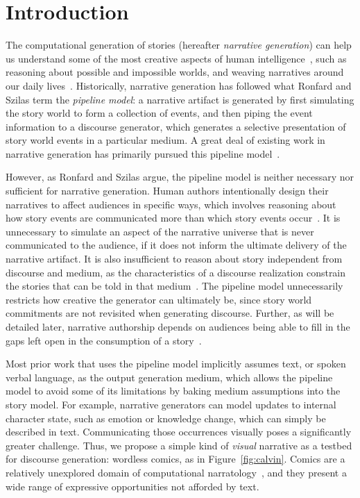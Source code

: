 \section{Introduction}

The computational generation of stories (hereafter {\em narrative
generation}) can help us understand some of the most creative aspects of
human intelligence~\cite{boyd2009origin}, such as reasoning about possible
and impossible worlds, and weaving narratives around our daily
lives~\cite{herman2013storytelling}.  Historically, narrative generation
has followed what Ronfard and Szilas \cite{ronfard2014story} term the
\emph{pipeline model}: a narrative artifact is generated by
first simulating the story world to form a collection of events, and then piping
the event information to a discourse generator, which generates a
selective presentation of story world events in a particular medium. A great
deal of existing work in narrative generation has primarily pursued this
pipeline model~\cite{gervas2009computational}. 

However, as Ronfard and Szilas argue, the pipeline model is neither
necessary nor sufficient for narrative generation.  Human authors
intentionally design their narratives to affect audiences in specific ways,
which involves reasoning about how story events are communicated more than
which story events occur~\cite{chatman1980story,bordwell1989making}. It is
unnecessary to simulate an aspect of the narrative universe that is never
communicated to the audience, if it does not inform the ultimate delivery
of the narrative artifact. It is also insufficient to reason about story
independent from discourse and medium, as the characteristics of a
discourse realization constrain the stories that can be told in that
medium~\cite{herman2004toward}.  The pipeline model unnecessarily restricts
how creative the generator can ultimately be, since story world commitments
are not revisited when generating discourse. Further, as will be detailed
later, narrative authorship depends on audiences being able to fill in the
gaps left open in the consumption of a
story~\cite{saraceni2016relatedness,magliano2016filling}.

Most prior work that uses the pipeline model implicitly assumes text, or
spoken verbal language, as the output generation medium, which allows the
pipeline model to avoid some of its limitations by baking medium
assumptions into the story model. For example, narrative generators can
model updates to internal character state, such as emotion or knowledge
change, which can simply be described in text. Communicating those
occurrences visually poses a significantly greater challenge.
Thus, we propose a simple kind of {\em visual} narrative as a testbed for
discourse generation: wordless comics, as in Figure~\ref{fig:calvin}. 
Comics are a relatively unexplored
domain of computational narratology~\cite{mani2012computational}, and they
present a wide range of expressive opportunities not afforded by text.

